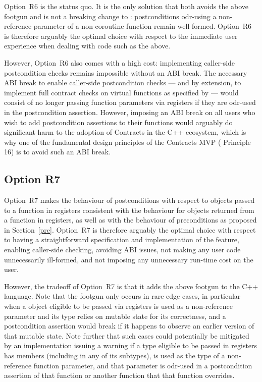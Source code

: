 Option~R6 is the status quo. It is the only solution that both avoids the above footgun and is not a breaking change to \cite{P2900R10}: postconditions odr-using a  non-reference parameter of a non-coroutine function remain well-formed. Option~R6 is therefore arguably the optimal choice with respect to the immediate user experience when dealing with code such as the above.

However, Option~R6 also comes with a high cost: implementing caller-side postcondition checks remains impossible without an ABI break. The necessary ABI break to enable caller-side postcondition checks --- and by extension, to implement full contract checks on virtual functions as specified by \cite{P2900R10} --- would consist of no longer passing function parameters via registers if they are odr-used in the postcondition assertion. However, imposing an ABI break on all users who wish to add postcondition assertions to their functions would arguably do significant harm to the adoption of Contracts in the C++ ecosystem, which is why one of the fundamental design principles of the Contracts MVP (\cite{P2900R10} Principle 16) is to avoid such an ABI break.

\subsection*{Option R7}

Option~R7 makes the behaviour of postconditions with respect to objects passed to a function in registers consistent with the behaviour for objects returned from a function in registers, as well as with the behaviour of preconditions as proposed in Section~\ref{pre}. Option~R7 is therefore arguably the optimal choice with respect to having a straightforward specification and implementation of the feature, enabling caller-side checking, avoiding ABI issues, not making any user code unnecessarily ill-formed, and not imposing any unnecessary run-time cost on the user.

However, the tradeoff of Option~R7 is that it adds the above footgun to the C++ language. Note that the footgun only occurs in rare edge cases, in particular when a  object eligible to be passed via registers is used as a non-reference parameter and its type relies on mutable state for its correctness, and a postcondition assertion would break if it happens to observe an earlier version of that mutable state. Note further that such cases could potentially be mitigated by an implementation issuing a warning if a type eligible to be passed in registers has  members (including in any of its subtypes), is used as the type of a non-reference function parameter, and that parameter is odr-used in a postcondition assertion of that function or another function that that function overrides.

